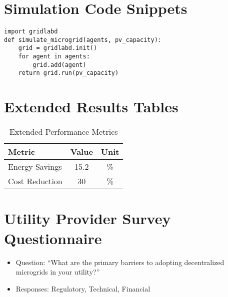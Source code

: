\documentclass[12pt]{report}
\begin{document}
\clearpage
\appendix
\chapter{Simulation Code Snippets}
\label{app:code}
\begin{lstlisting}[caption={GridLAB-D Simulation Code},label={lst:gridlabd}]
import gridlabd
def simulate_microgrid(agents, pv_capacity):
    grid = gridlabd.init()
    for agent in agents:
        grid.add(agent)
    return grid.run(pv_capacity)
\end{lstlisting}

\chapter{Extended Results Tables}
\label{app:results}
\begin{table}[h]
  \centering
  \caption{Extended Performance Metrics}
  \label{tab:extended_results}
  \begin{tabular}{l c c}
    \toprule
    Metric & Value & Unit \\
    \midrule
    Energy Savings & 15.2 & \% \\
    Cost Reduction & 30 & \% \\
    \bottomrule
  \end{tabular}
\end{table}

\chapter{Utility Provider Survey Questionnaire}
\label{app:survey}
\begin{itemize}
  \item Question: ``What are the primary barriers to adopting decentralized microgrids in your utility?''
  \item Responses: Regulatory, Technical, Financial
\end{itemize}
\end{document}

